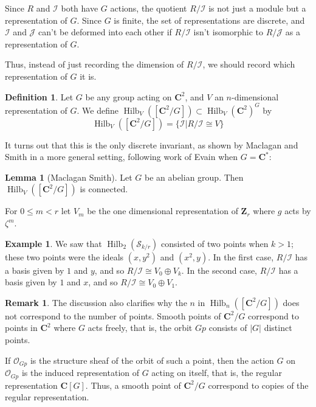\documentclass{amsart}[12pt]
\theoremstyle{definition}
\newtheorem{lemma}[dummy]{Lemma}
\newtheorem{example}[dummy]{Example}
\newtheorem{definition}[dummy]{Definition}
\newtheorem{remark}[dummy]{Remark}
\newcommand{\Z}{\mathbf{Z}}
\newcommand{\C}{\mathbf{C}}
\newcommand{\II}{\mathcal{I}}
\newcommand{\Sur}{\mathcal{S}}
\DeclareMathOperator{\Hilb}{Hilb}
\begin{document}
 Since $R$ and $\II$ both have $G$ actions, the quotient $R/\II$ is not just a module but a representation of $G$.  Since $G$ is finite, the set of representations are discrete, and $\II$ and $\mathcal{J}$ can't be deformed into each other if $R/\II$ isn't isomorphic to $R/\mathcal{J}$ as a representation of $G$.  

Thus, instead of just recording the dimension of $R/\II$, we should record which representation of $G$ it is.

\begin{definition}
Let $G$ be any group acting on $\C^2$, and $V$ an $n$-dimensional representation of $G$. We define $\Hilb_V([\C^2/G])\subset \Hilb_V(\C^2)^G$ by
 $$\Hilb_V([\C^2/G])=\{\II|R/\II\cong V\}$$
\end{definition}

It turns out that this is the only discrete invariant, as shown by Maclagan and Smith \cite{MS} in a more general setting, following work of Evain \cite{evain1} when $G=\C^*$:

\begin{lemma}[Maclagan Smith] 
  Let $G$ be an abelian group.  Then $\Hilb_V([\C^2/G])$ is connected.
\end{lemma}


For $0\leq m< r$ let $V_m$ be the one dimensional representation of $\Z_r$ where $g$ acts by $\zeta^m$.  

\begin{example}
We saw that $\Hilb_2(\Sur_{k/r})$ consisted of two points when $k>1$; these two points were the ideals $(x,y^2)$ and $(x^2,y)$.  In the first case, $R/\II$ has a basis given by $1$ and $y$, and so $R/\II\cong V_0\oplus V_k$.  In the second case, $R/\II$ has a basis given by $1$ and $x$, and so $R/\II\cong V_0\oplus V_1$.
\end{example}

\begin{remark} \label{rmk:smoothregular}
The discussion also clarifies why the $n$ in $\Hilb_n([\C^2/G])$ does not correspond to the number of points.   Smooth points of $\C^2/G$ correspond to points in $\C^2$ where $G$ acts freely, that is, the orbit $Gp$ consists of $|G|$ distinct points.

If $\mathcal{O}_{Gp}$ is the structure sheaf of the orbit of such a point, then the action $G$ on $\mathcal{O}_{Gp}$ is the induced representation of $G$ acting on itself, that is, the regular representation $\C[G]$. Thus, a smooth point of $\C^2/G$ correspond to copies of the regular representation.
\end{remark}
\end{document}
